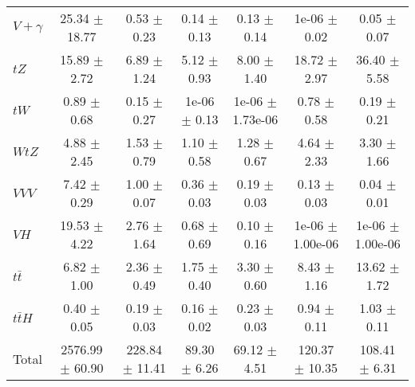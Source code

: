 \begin{tabular}{|l|S|S|S|S|S|S|}
  $V+\gamma$   & 25.34 $\pm$ 18.77 & 0.53 $\pm$ 0.23 & 0.14 $\pm$ 0.13 & 0.13 $\pm$ 0.14 & 1e-06 $\pm$ 0.02 & 0.05 $\pm$ 0.07 \\ 
  $tZ$   & 15.89 $\pm$ 2.72 & 6.89 $\pm$ 1.24 & 5.12 $\pm$ 0.93 & 8.00 $\pm$ 1.40 & 18.72 $\pm$ 2.97 & 36.40 $\pm$ 5.58 \\ 
  $tW$   & 0.89 $\pm$ 0.68 & 0.15 $\pm$ 0.27 & 1e-06 $\pm$ 0.13 & 1e-06 $\pm$ 1.73e-06 & 0.78 $\pm$ 0.58 & 0.19 $\pm$ 0.21 \\ 
  $WtZ$   & 4.88 $\pm$ 2.45 & 1.53 $\pm$ 0.79 & 1.10 $\pm$ 0.58 & 1.28 $\pm$ 0.67 & 4.64 $\pm$ 2.33 & 3.30 $\pm$ 1.66 \\ 
  $VVV$   & 7.42 $\pm$ 0.29 & 1.00 $\pm$ 0.07 & 0.36 $\pm$ 0.03 & 0.19 $\pm$ 0.03 & 0.13 $\pm$ 0.03 & 0.04 $\pm$ 0.01 \\ 
  $VH$   & 19.53 $\pm$ 4.22 & 2.76 $\pm$ 1.64 & 0.68 $\pm$ 0.69 & 0.10 $\pm$ 0.16 & 1e-06 $\pm$ 1.00e-06 & 1e-06 $\pm$ 1.00e-06 \\ 
  $t\bar{t}$   & 6.82 $\pm$ 1.00 & 2.36 $\pm$ 0.49 & 1.75 $\pm$ 0.40 & 3.30 $\pm$ 0.60 & 8.43 $\pm$ 1.16 & 13.62 $\pm$ 1.72 \\ 
  $t\bar{t}H$   & 0.40 $\pm$ 0.05 & 0.19 $\pm$ 0.03 & 0.16 $\pm$ 0.02 & 0.23 $\pm$ 0.03 & 0.94 $\pm$ 0.11 & 1.03 $\pm$ 0.11 \\ 
\hline 
  Total  & 2576.99 $\pm$ 60.90 & 228.84 $\pm$ 11.41 & 89.30 $\pm$ 6.26 & 69.12 $\pm$ 4.51 & 120.37 $\pm$ 10.35 & 108.41 $\pm$ 6.31 \\ 
\hline 
\end{tabular} 

